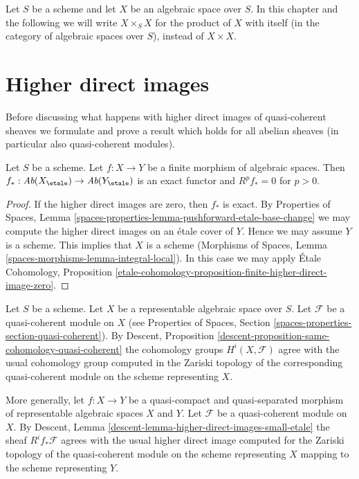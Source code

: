 \medskip\noindent
Let $S$ be a scheme and let $X$ be an algebraic space over $S$.
In this chapter and the following we will write $X \times_S X$
for the product of $X$ with itself (in the category of algebraic
spaces over $S$), instead of $X \times X$.








\section{Higher direct images}
\label{section-higher-direct-image}

\noindent
Before discussing what happens with higher direct images of quasi-coherent
sheaves we formulate and prove a result which holds for all abelian sheaves
(in particular also quasi-coherent modules).

\begin{lemma}
\label{lemma-finite-higher-direct-image-zero}
Let $S$ be a scheme. Let $f : X \to Y$ be a finite morphism of algebraic
spaces. Then $f_* : \textit{Ab}(X_\etale) \to \textit{Ab}(Y_\etale)$
is an exact functor and $R^pf_* = 0$ for $p > 0$.
\end{lemma}

\begin{proof}
If the higher direct images are zero, then $f_*$ is exact.
By Properties of Spaces, Lemma
\ref{spaces-properties-lemma-pushforward-etale-base-change}
we may compute the higher direct images on an \'etale cover of $Y$.
Hence we may assume $Y$ is a scheme. This implies that
$X$ is a scheme (Morphisms of Spaces, Lemma
\ref{spaces-morphisms-lemma-integral-local}).
In this case we may apply
\'Etale Cohomology, Proposition
\ref{etale-cohomology-proposition-finite-higher-direct-image-zero}.
\end{proof}

\noindent
Let $S$ be a scheme. Let $X$ be a representable algebraic space over $S$.
Let $\mathcal{F}$ be a quasi-coherent module on $X$ (see
Properties of Spaces, Section \ref{spaces-properties-section-quasi-coherent}).
By
Descent, Proposition \ref{descent-proposition-same-cohomology-quasi-coherent}
the cohomology groups $H^i(X, \mathcal{F})$ agree with the usual
cohomology group computed in the Zariski topology of the corresponding
quasi-coherent module on the scheme representing $X$.

\medskip\noindent
More generally, let $f : X \to Y$ be a quasi-compact and quasi-separated
morphism of representable algebraic spaces $X$ and $Y$. Let
$\mathcal{F}$ be a quasi-coherent module on $X$. By
Descent, Lemma \ref{descent-lemma-higher-direct-images-small-etale}
the sheaf $R^if_*\mathcal{F}$ agrees with the
usual higher direct image computed for the Zariski topology
of the quasi-coherent module on the scheme representing $X$
mapping to the scheme representing $Y$.

